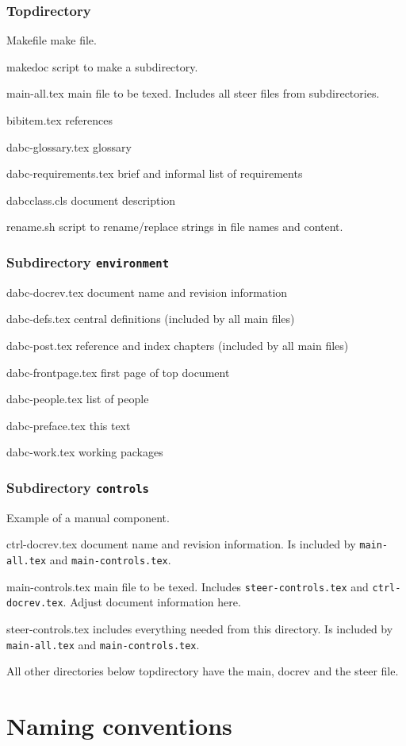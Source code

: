 \subsubsection{Topdirectory}
\begin{compactdesc}
\item[Makefile] make file.
\item[makedoc] script to make a subdirectory.
\item[main-all.tex] main file to be texed. Includes all steer files from subdirectories.
\item[bibitem.tex] references
\item[dabc-glossary.tex] glossary
\item[dabc-requirements.tex] brief and informal list of requirements
\item[dabcclass.cls] document description
\item[rename.sh] script to rename/replace strings in file names and content.
\end{compactdesc}
\subsubsection{Subdirectory {\tt environment}}
\begin{compactdesc}
\item[dabc-docrev.tex] document name and revision information
\item[dabc-defs.tex] central definitions (included by all main files)
\item[dabc-post.tex] reference and index chapters (included by all main files)
\item[dabc-frontpage.tex] first page of top document
\item[dabc-people.tex] list of people
\item[dabc-preface.tex] this text
\item[dabc-work.tex] working packages
\end{compactdesc}
\subsubsection{Subdirectory {\tt controls}}
Example of a manual component. 
\begin{compactdesc}
\item[ctrl-docrev.tex] document name and revision information.
Is included by {\tt main-all.tex} and {\tt main-controls.tex}.
\item[main-controls.tex] main file to be texed.
Includes {\tt steer-controls.tex} and {\tt ctrl-docrev.tex}. Adjust document information here.
\item[steer-controls.tex] includes everything needed from this directory.
Is included by {\tt main-all.tex} and {\tt main-controls.tex}.
\end{compactdesc}
All other directories below topdirectory have the main, docrev and the steer file.
\section{Naming conventions}
